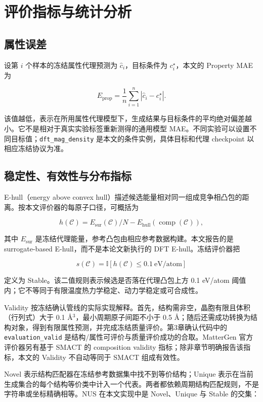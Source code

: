 \section{评价指标与统计分析}

\subsection{属性误差}

设第 \(i\) 个样本的冻结属性代理预测为 \(\hat c_i\)，目标条件为 \(c_i^\star\)，本文的 Property MAE 为

\[
E_{\mathrm{prop}}
=\frac{1}{n}\sum_{i=1}^{n}\left|\hat c_i-c_i^\star\right|.
\tag{2-18}
\]

该值越低，表示在所用属性代理模型下，生成结果与目标条件的平均绝对偏差越小。它不是相对于真实实验标签重新测得的通用模型 MAE。不同实验可以设置不同目标值；\texttt{dft\_mag\_density} 是本文的条件实例，具体目标和代理 checkpoint 以相应冻结协议为准。

\subsection{稳定性、有效性与分布指标}

E-hull（energy above convex hull）描述候选能量相对同一组成竞争相凸包的距离。按本文评价器的每原子口径，可概括为

\[
h(\mathcal C)
=E_{\mathrm{sur}}(\mathcal C)/N-E_{\mathrm{hull}}(\operatorname{comp}(\mathcal C)),
\tag{2-19}
\]

其中 \(E_{\mathrm{sur}}\) 是冻结代理能量，参考凸包由相应参考数据构建。本文报告的是 surrogate-based E-hull，而不是本论文新执行的 DFT E-hull。冻结评价器把

\[
s(\mathcal C)=\mathbb I[h(\mathcal C)\leq0.1\ \mathrm{eV/atom}]
\tag{2-20}
\]

定义为 Stable。该二值规则表示候选是否落在代理凸包上方 0.1 eV/atom 阈值内；它不等同于有限温度热力学稳定、动力学稳定或可合成性。

Validity 按冻结确认管线的实际实现解释。首先，结构需非空，晶胞有限且体积（行列式）大于 0.1 Å\(^3\)，最小周期原子间距不小于 0.5 Å；随后还需成功转换为结构对象，得到有限属性预测，并完成冻结质量评价。第3章确认代码中的 \texttt{evaluation\_valid} 是结构/属性可评价与质量评价成功的合取。MatterGen 官方评价器另有基于 SMACT 的 composition validity 指标；除非章节明确报告该指标，本文的 Validity 不自动等同于 SMACT 组成有效性。

Novel 表示结构匹配器在冻结参考数据集中找不到等价结构；Unique 表示在当前生成集合的每个结构等价类中计入一个代表。两者都依赖周期结构匹配规则，不是字符串或坐标精确相等。NUS 在本文实现中是 Novel、Unique 与 Stable 的交集：

